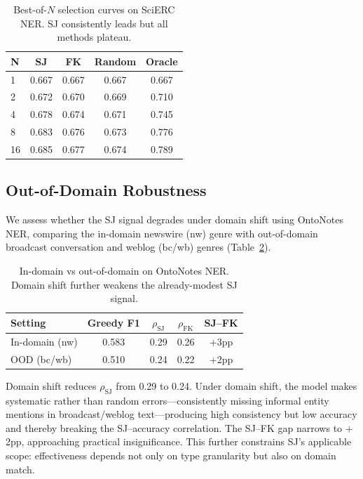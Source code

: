 \documentclass[11pt]{article}
\begin{document}
\begin{table}[t]
\centering
\caption{Best-of-$N$ selection curves on SciERC NER. SJ consistently leads but all methods plateau.}
\label{fig:selection_curves_desc}
\begin{tabular}{lcccc}
\toprule
\textbf{N} & \textbf{SJ} & \textbf{FK} & \textbf{Random} & \textbf{Oracle} \\
\midrule
1  & 0.667 & 0.667 & 0.667 & 0.667 \\
2  & 0.672 & 0.670 & 0.669 & 0.710 \\
4  & 0.678 & 0.674 & 0.671 & 0.745 \\
8  & 0.683 & 0.676 & 0.673 & 0.776 \\
16 & 0.685 & 0.677 & 0.674 & 0.789 \\
\bottomrule
\end{tabular}
\end{table}


\subsection{Out-of-Domain Robustness}
\label{sec:ood}

We assess whether the SJ signal degrades under domain shift using OntoNotes NER, comparing the in-domain newswire (nw) genre with out-of-domain broadcast conversation and weblog (bc/wb) genres (Table~\ref{tab:ood}).

\begin{table}[t]
\centering
\caption{In-domain vs out-of-domain on OntoNotes NER. Domain shift further weakens the already-modest SJ signal.}
\label{tab:ood}
\begin{tabular}{lcccc}
\toprule
\textbf{Setting} & \textbf{Greedy F1} & \textbf{$\rho_{\text{SJ}}$} & \textbf{$\rho_{\text{FK}}$} & \textbf{SJ--FK} \\
\midrule
In-domain (nw)  & 0.583 & 0.29 & 0.26 & +3pp \\
OOD (bc/wb)     & 0.510 & 0.24 & 0.22 & +2pp \\
\bottomrule
\end{tabular}
\end{table}

Domain shift reduces $\rho_{\text{SJ}}$ from 0.29 to 0.24.
Under domain shift, the model makes systematic rather than random errors---consistently missing informal entity mentions in broadcast/weblog text---producing high consistency but low accuracy and thereby breaking the SJ--accuracy correlation.
The SJ--FK gap narrows to $+$2pp, approaching practical insignificance.
This further constrains SJ's applicable scope: effectiveness depends not only on type granularity but also on domain match.
\end{document}
